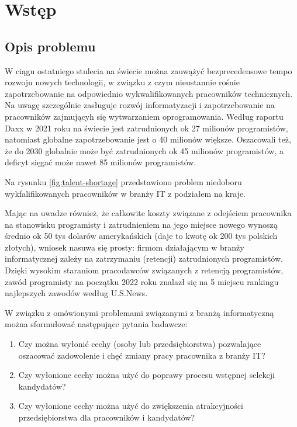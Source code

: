 
\chapter*{Wstęp}\label{ch:admission}

\section*{Opis problemu}\label{sec:admission:problem-description}

W ciągu ostatniego stulecia na świecie można zauwążyć bezprecedensowe tempo rozwoju nowych technologii,
w związku z czym nieustannie rośnie zapotrzebowanie na odpowiednio wykwalifikowanych pracowników technicznych.
Na uwagę szczególnie zasługuje rozwój informatyzacji i zapotrzebowanie na pracowników zajmującyh się wytwarzaniem oprogramowania.
Według raportu Daxx w 2021 roku na świecie jest zatrudnionych ok 27 milionów programistów, natomiast globalne zapotrzebowanie jest o 40 milionów większe.
Oszacowali też, że do 2030 globalnie może być zatrudnionych ok 45 milionów programistów, a deficyt sięgać może nawet 85 milionów programistów\cite{daxx-2021}.

Na rysunku \ref{fig:talent-shortage} przedstawiono problem niedoboru wykfalifikowanych pracowników w branży IT z podziałem na kraje.


Mając na uwadze również, że całkowite koszty związane z odejściem pracownika na stanowisku programisty i zatrudnieniem na jego miejsce nowego
wynoszą średnio ok 50 tys dolarów amerykańskich\cite{hairing-dev-2021} (daje to kwotę ok 200 tys polskich złotych), wniosek nasuwa się prosty:
firmom działającym w branży informatycznej zależy na zatrzymaniu (retencji) zatrudnionych programistów.
Dzięki wysokim staraniom pracodawców związanych z retencją programistów,
zawód programisty na początku 2022 roku znalazł się na 5 miejscu rankingu najlepszych zawodów według U.S.News\cite{us-news-2022}.

W związku z omówionymi problemami związanymi z branżą informatyczną można sformułować następujące pytania badawcze:
\begin{enumerate}
    \item Czy można wyłonić cechy (osoby lub przedsiębiorstwa) pozwalające oszacować zadowolenie i chęć zmiany pracy pracownika z branży IT?
    \item Czy wyłonione cechy można użyć do poprawy procesu wstępnej selekcji kandydatów?
    \item Czy wyłonione cechy można użyć do zwiększenia atrakcyjności przedsiębiorstwa dla pracowników i kandydatów?
\end{enumerate}

